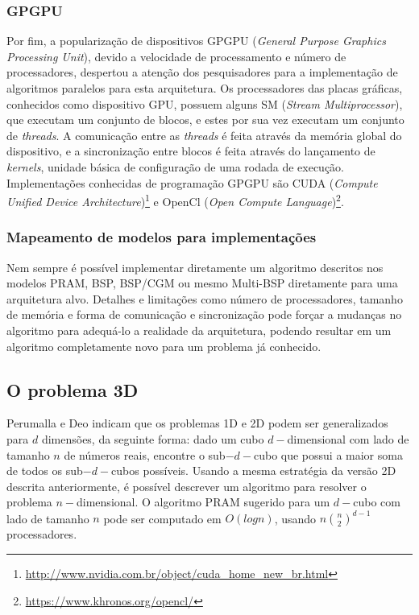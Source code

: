 \documentclass[a4paper, 12pt] {article}
\begin{document}
\subsubsection{GPGPU}

Por fim, a popularização de dispositivos GPGPU (\textit{General Purpose Graphics
Processing Unit}), devido a velocidade de processamento e número de
processadores, despertou a atenção dos pesquisadores para a implementação de
algoritmos paralelos para esta arquitetura. Os processadores das placas gráficas, conhecidos como dispositivo GPU, possuem
alguns SM (\textit{Stream Multiprocessor}), que executam um conjunto de blocos, e estes
por sua vez executam um conjunto de \textit{threads}. A comunicação entre as
\textit{threads} é feita através da memória global do dispositivo, e a
sincronização entre blocos é feita através do lançamento de \textit{kernels},
unidade básica de configuração de uma rodada de execução. Implementações
conhecidas de programação GPGPU são CUDA (\textit{Compute Unified Device
Architecture})\footnote{\url{http://www.nvidia.com.br/object/cuda_home_new_br.html}}
e OpenCl (\textit{Open Compute
Language})\footnote{\url{https://www.khronos.org/opencl/}}.

\subsubsection{Mapeamento de modelos para implementações}

Nem sempre é possível implementar diretamente um algoritmo descritos nos modelos
PRAM, BSP, BSP/CGM ou mesmo Multi-BSP diretamente para uma arquitetura alvo.
Detalhes e limitações como número de processadores, tamanho de memória e forma
de comunicação e sincronização pode forçar a mudanças no algoritmo para
adequá-lo a realidade da arquitetura, podendo resultar em um algoritmo
completamente novo para um problema já conhecido.

\subsection{O problema 3D}

Perumalla e Deo\cite{journals/ppl/PerumallaD95} indicam que os problemas 1D e 2D
podem ser generalizados para $d$ dimensões, da seguinte forma: dado um cubo $d-$dimensional com lado de tamanho $n$ de números reais,
encontre o sub$-d-$cubo que possui a maior soma de todos os sub$-d-$cubos
possíveis. Usando a mesma estratégia da versão 2D descrita anteriormente, é
possível descrever um algoritmo para resolver o problema $n-$dimensional. O
algoritmo PRAM sugerido para um $d-$cubo com lado de tamanho $n$ pode ser
computado em $O(log n)$, usando $n\binom{n}{2}^{d-1}$ processadores.
\end{document}
